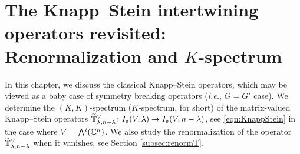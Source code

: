 \newpage
\section{The Knapp--Stein intertwining operators revisited:
 Renormalization and $K$-spectrum}
\label{sec:psdetail}

In this chapter,
 we discuss the classical Knapp--Stein operators,
 which may be viewed
 as a baby case of symmetry breaking operators
 ({\it{i.e.}},  $G=G'$ case).  
We determine the $(K,K)$-spectrum
 ($K$-spectrum, for short)
 of the matrix-valued Knapp--Stein operators
 $\widetilde{{\mathbb{T}}}_{{\lambda},{n-\lambda}}^{{V}} \colon I_{\delta}(V,\lambda) \to I_{\delta}(V,n-\lambda)$, 
 see \eqref{eqn:KnappStein}
 in the case where $V=\Exterior^i({\mathbb{C}}^n)$.  
We also study the renormalization
of the operator $\widetilde{{\mathbb{T}}}_{{\lambda},{n-\lambda}}^{{V}}$
 when it vanishes,
 see Section \ref{subsec:renormT}.  


